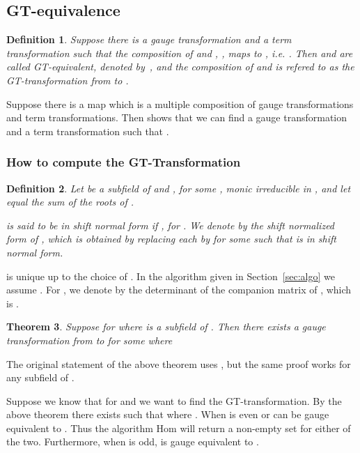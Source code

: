 \documentclass{article}
\newtheorem{theorem}{Theorem}[section]
\newtheorem{definition}[theorem]{Definition}
\begin{document}
\subsection{GT-equivalence}

\begin{definition}
  Suppose there is a gauge transformation  and a term transformation  such that the
  composition of  and , , maps  to , i.e. 
   .  
  Then  and  are called GT-equivalent, denoted by~, and the composition of  and  is refered to as the GT-transformation from
   to .
\end{definition}



Suppose there is a map  which is a multiple composition of gauge transformations and term transformations. Then 
\cite[Theorem 3.3.]{Le10} shows that we can find a gauge transformation  and a term transformation  such that
.



\subsubsection{How to compute the GT-Transformation}

\begin{definition}\label{SNFdef}
  Let   be a subfield of  and , for some ,
  monic irreducible in , and let  equal
  the sum of the roots of .

   is said to be in {\em shift normal form} if , for . We denote by  the shift normalized form
  of , which is obtained by replacing each  by  for some  such that  is in shift normal form.
\end{definition}

 is unique up to the choice of . In the algorithm given in
Section~\ref{sec:algo} we assume .  For ,
we denote by  the determinant of the companion matrix of , which is
.

\begin{theorem}\cite[Theorem 2.3.9]{YC11}\label{tpsuff}
  Suppose  for  where  is a subfield of
  .  Then there exists a gauge transformation  from  to  for some  where 
\end{theorem}

The original statement of the above theorem uses , but the same proof works for any
subfield  of .

Suppose we know that  for  and we want to
find the GT-transformation.  By the above theorem there exists  such that
 where .  When  is even  or  can be gauge equivalent to .  Thus the
algorithm Hom will return a non-empty set for either of the two. Furthermore, when  is
odd,  is gauge equivalent to .
\end{document}
